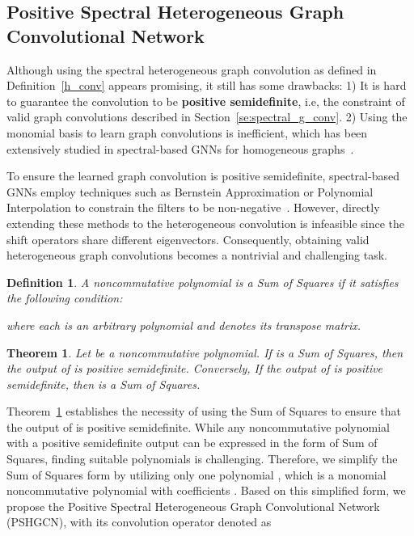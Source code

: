 \documentclass{article}
\newtheorem{theorem}{Theorem}[section]
\newtheorem{definition}{Definition}[section]
\begin{document}
\subsection{Positive Spectral Heterogeneous Graph Convolutional Network}
Although using the spectral heterogeneous graph convolution as defined in Definition~\ref{h_conv} appears promising, it still has some drawbacks: 1) It is hard to guarantee the convolution  to be \textbf{positive semidefinite}, i.e, the constraint of valid graph convolutions described in Section~\ref{se:spectral_g_conv}. 2) Using the monomial basis to learn graph convolutions is inefficient, which has been extensively studied in spectral-based GNNs for homogeneous graphs~\cite{bernnet,jacobi,chebnetii}.

To ensure the learned graph convolution is positive semidefinite, spectral-based GNNs employ techniques such as Bernstein Approximation or Polynomial Interpolation to constrain the filters  to be non-negative~\cite{bernnet,chebnetii}. However, directly extending these methods to the heterogeneous convolution  is infeasible since the shift operators  share different eigenvectors. Consequently, obtaining valid heterogeneous graph convolutions becomes a nontrivial and challenging task.




\begin{definition}\label{sos}
{\rm \cite{positive-poly}}
A noncommutative polynomial  is a Sum of Squares if it satisfies the following condition:

where each  is an arbitrary polynomial and  denotes its transpose matrix.
\end{definition}


\begin{theorem}\label{th_sos_posi}
{\rm \cite{positive-poly}} Let  be a noncommutative polynomial. If  is a Sum of Squares, then the output of  is positive semidefinite. Conversely,   If the output of  is positive semidefinite, then  is a Sum of Squares.
\end{theorem}

Theorem~\ref{th_sos_posi} establishes the necessity of using the Sum of Squares to ensure that the output of  is positive semidefinite.  While any noncommutative polynomial with a positive semidefinite output can be expressed in the form of Sum of Squares, finding suitable polynomials  is challenging. Therefore, we simplify the Sum of Squares form by utilizing only one polynomial , which is a monomial noncommutative polynomial with coefficients . Based on this simplified form, we propose the Positive Spectral Heterogeneous Graph Convolutional Network (PSHGCN), with its convolution operator denoted as
\end{document}
